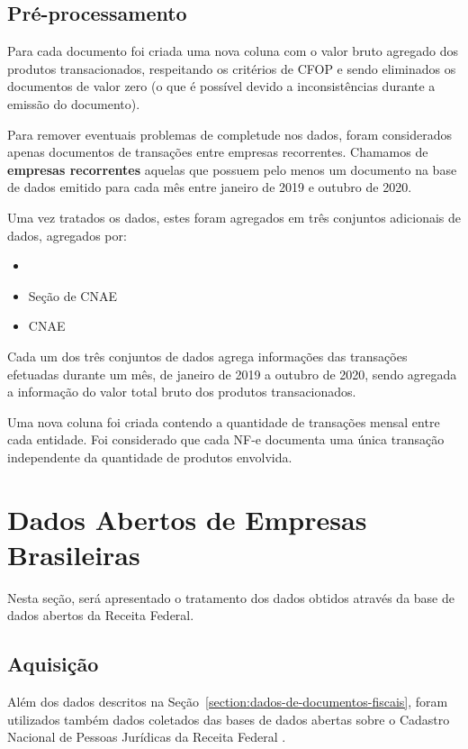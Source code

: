 \subsection{Pré-processamento}

Para cada documento foi criada uma nova coluna com o valor bruto agregado dos produtos transacionados, respeitando os critérios de CFOP e sendo eliminados os documentos de valor zero (o que é possível devido a inconsistências durante a emissão do documento).

Para remover eventuais problemas de completude nos dados, foram considerados apenas documentos de transações entre empresas recorrentes. Chamamos de \textbf{empresas recorrentes} aquelas que possuem pelo menos um documento na base de dados emitido para cada mês entre janeiro de 2019 e outubro de 2020.

Uma vez tratados os dados, estes foram agregados em três conjuntos adicionais de dados, agregados por:

\begin{itemize}
    \item {}
    \item Seção de CNAE
    \item CNAE
\end{itemize}

Cada um dos três conjuntos de dados agrega informações das transações efetuadas durante um mês, de janeiro de 2019 a outubro de 2020, sendo agregada a informação do valor total bruto dos produtos transacionados.

Uma nova coluna foi criada contendo a quantidade de transações mensal entre cada entidade. Foi considerado que cada NF-e documenta uma única transação independente da quantidade de produtos envolvida.

\section{Dados Abertos de Empresas Brasileiras}
\label{section:dados-abertos-receita}

Nesta seção, será apresentado o tratamento dos dados obtidos através da base de dados abertos da Receita Federal.

\subsection{Aquisição}

Além dos dados descritos na Seção~\ref{section:dados-de-documentos-fiscais}, foram utilizados também dados coletados das bases de dados abertas sobre o Cadastro Nacional de Pessoas Jurídicas da Receita Federal \cite{receita:dados-publicos:cnpj}.

